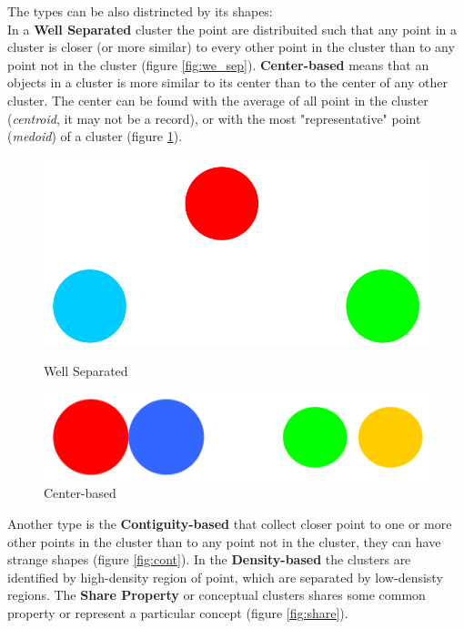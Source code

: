 \documentclass[12pt]{article}
\begin{document}
The types can be also distrincted by its shapes:\\
In a \textbf{Well Separated} cluster the point are distribuited such that any point in a cluster is closer (or more similar) to every other point in the cluster than to any point not in the cluster (figure \ref{fig:we_sep}).
\textbf{Center-based} means that an objects in a cluster is more similar to its center than to the center of any other cluster. The center can be found with the average of all point in the cluster (\textit{centroid}, it may not be a record), or with the most "representative" point (\textit{medoid}) of a cluster (figure \ref{fig:ce_ba}).
\begin{figure}[h!]
  \centering
  \begin{minipage}{.45\textwidth}
    \centering
    \includegraphics[width=\linewidth]{images/we_sep.png}
    \caption{Well Separated}
    \label{fig:we_sep}
  \end{minipage}\hfill
  \begin{minipage}{.45\textwidth}
    \centering
    \includegraphics[width=\linewidth]{images/ce_ba.png}
    \caption{Center-based}
    \label{fig:ce_ba}
  \end{minipage}\hfill
\end{figure}
Another type is the \textbf{Contiguity-based} that collect closer point to one or more other points in the cluster than to any point not in the cluster, they can have strange shapes (figure \ref{fig:cont}). In the \textbf{Density-based} the clusters are identified by high-density region of point, which are separated by low-densisty regions. The \textbf{Share Property} or conceptual clusters shares some common property or represent a particular concept (figure \ref{fig:share}).
\end{document}
